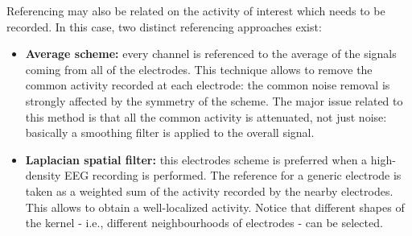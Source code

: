 Referencing may also be related on the activity of interest which needs to be
recorded. In this case, two distinct referencing approaches exist:
\begin{itemize}
    \item \textbf{Average scheme:} every channel is referenced to the average of the signals coming from
          all of the electrodes. This technique allows to remove the common activity recorded at
          each electrode: the common noise removal is strongly affected by the symmetry of the scheme.
          The major issue related to this method is that all the common activity is attenuated, not
          just noise: basically a smoothing filter is applied to the overall signal.
    \item \textbf{Laplacian spatial filter:} this electrodes scheme is preferred when a high-density
          EEG recording is performed. The reference for a generic electrode is taken as a weighted
          sum of the activity recorded by the nearby electrodes. This allows to obtain a
          well-localized activity. Notice that different shapes of the kernel - i.e., different
          neighbourhoods of electrodes - can be selected.
\end{itemize}

